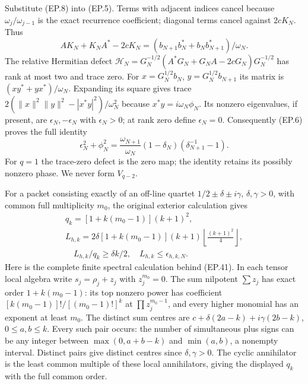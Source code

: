 \documentclass[11pt,a4paper]{article}
\begin{document}
Substitute (EP.8) into (EP.5). Terms with adjacent indices cancel
because $\omega_j/\omega_{j-1}$ is the exact recurrence coefficient;
diagonal terms cancel against $2cK_N$. Thus
\[
 AK_N+K_NA^*-2cK_N=
 (b_{N+1}b_N^*+b_Nb_{N+1}^*)/\omega_N.\tag{EP.10}
\]
The relative Hermitian defect
$\mathcal H_N=G_N^{-1/2}(A^*G_N+G_NA-2cG_N)G_N^{-1/2}$
has rank at most two and trace zero. For
$x=G_N^{1/2}b_N$, $y=G_N^{1/2}b_{N+1}$ its matrix is
$(xy^*+yx^*)/\omega_N$. Expanding its square gives trace
$2(\|x\|^2\|y\|^2-|x^*y|^2)/\omega_N^2$ because
$x^*y=i\omega_N\phi_N$. Its nonzero eigenvalues, if present,
are $\epsilon_N,-\epsilon_N$ with $\epsilon_N>0$; at rank zero
define $\epsilon_N=0$.
Consequently (EP.6) proves the full identity
\[
 \boxed{\epsilon_N^2+\phi_N^2=
 \frac{\omega_{N+1}}{\omega_N}(1-\delta_N)
                    (\delta_{N+1}^{-1}-1).}\tag{EP.11}
\]
For $q=1$ the trace-zero defect is the zero map; the identity retains
its possibly nonzero phase. We never form $V_{q-2}$.



For a packet consisting exactly of an off-line quartet
$1/2\pm\delta\pm i\gamma$, $\delta,\gamma>0$, with common full
multiplicity $m_0$, the original exterior calculation gives
\[
 \begin{gathered}
 q_k=[1+k(m_0-1)](k+1)^2,\\
 L_{h,k}=2\delta[1+k(m_0-1)](k+1)
       \left\lfloor\frac{(k+1)^2}{4}\right\rfloor,\\
 \quad L_{h,k}/q_k\ge\delta k/2,
 \quad L_{h,k}\le\epsilon_{h,k,N}.
 \end{gathered}\tag{EP.41}
\]
Here is the complete finite spectral calculation behind (EP.41).
In each tensor local algebra write $s_j=\rho_j+z_j$ with
$z_j^{m_0}=0$. The sum nilpotent $\sum z_j$ has exact order
$1+k(m_0-1)$: its top nonzero power has coefficient
$[k(m_0-1)]!/[(m_0-1)!]^k$ at $\prod z_j^{m_0-1}$, and every
higher monomial has an exponent at least $m_0$.
The distinct sum centres are
$c+\delta(2a-k)+i\gamma(2b-k)$, $0\le a,b\le k$.
Every such pair occurs: the number of simultaneous plus signs can
be any integer between $\max(0,a+b-k)$ and $\min(a,b)$, a nonempty
interval. Distinct pairs give distinct centres since $\delta,\gamma>0$.
The cyclic annihilator is the least common multiple of these local
annihilators, giving the displayed $q_k$ with the full common order.
\end{document}
